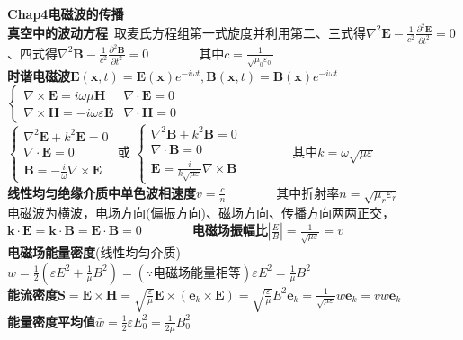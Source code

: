 \documentclass[10pt,a4paper]{article}
\begin{document}
\begin{multicols}{2}
\noindent\textbf{Chap4电磁波的传播}\\
\textbf{真空中的波动方程}~取麦氏方程组第一式旋度并利用第二、三式得$\nabla^2\bm{E}-\frac{1}{c^2}\frac{\partial^2\bm{E}}{\partial t^2}=0$\\
、四式得$\nabla^2\bm{B}-\frac{1}{c^2}\frac{\partial^2\bm{B}}{\partial t^2}=0$~~~~~~~~其中$c=\frac{1}{\sqrt{\mu_0\varepsilon_0}}$\\
\textbf{时谐电磁波}$\bm{E}(\bm{x},t)=\bm{E}(\bm{x})e^{-i\omega t},\bm{B}(\bm{x},t)=\bm{B}(\bm{x})e^{-i\omega t}$\\
$\left\{\begin{array}{ll}\nabla\times\bm{E}=i\omega\mu\bm{H}&\nabla\cdot\bm{E}=0\\\nabla\times\bm{H}=-i\omega\varepsilon\bm{E}&\nabla\cdot\bm{H}=0\end{array}\right.$\\
$\left\{\begin{array}{l}\nabla^2\bm{E}+k^2\bm{E}=0\\\nabla\cdot\bm{E}=0\\\bm{B}=-\frac{i}{\omega}\nabla\times\bm{E}\end{array}\right.$ 或 $\left\{\begin{array}{l}\nabla^2\bm{B}+k^2\bm{B}=0\\\nabla\cdot\bm{B}=0\\\bm{E}=\frac{i}{k\sqrt{\mu\varepsilon}}\nabla\times\bm{B}\end{array}\right.$~~~~~~~~其中$k=\omega\sqrt{\mu\varepsilon}$\\
\textbf{线性均匀绝缘介质中单色波相速度}$v=\frac{c}{n}$~~~~~~~~其中折射率$n=\sqrt{\mu_r\varepsilon_r}$\\
电磁波为横波，电场方向(偏振方向)、磁场方向、传播方向两两正交，$\bm{k}\cdot\bm{E}=\bm{k}\cdot\bm{B}=\bm{E}\cdot\bm{B}=0$~~~~~~~~\textbf{电磁场振幅比}$|\frac{E}{B}|=\frac{1}{\sqrt{\mu\varepsilon}}=v$\\
\textbf{电磁场能量密度}(线性均匀介质)$w=\frac{1}{2}(\varepsilon E^2+\frac{1}{\mu}B^2)=(\because\text{电磁场能量相等})\varepsilon E^2=\frac{1}{\mu}B^2$\\
\textbf{能流密度}$\bm{S}=\bm{E}\times\bm{H}=\sqrt{\frac{\varepsilon}{\mu}}\bm{E}\times(\bm{e}_k\times\bm{E})=\sqrt{\frac{\varepsilon}{\mu}}E^2\bm{e}_k=\frac{1}{\sqrt{\mu\varepsilon}}w\bm{e}_k=vw\bm{e}_k$\\
\textbf{能量密度平均值}$\bar{w}=\frac{1}{2}\varepsilon E_0^2=\frac{1}{2\mu}B_0^2$\\

\end{multicols}
\end{document}
